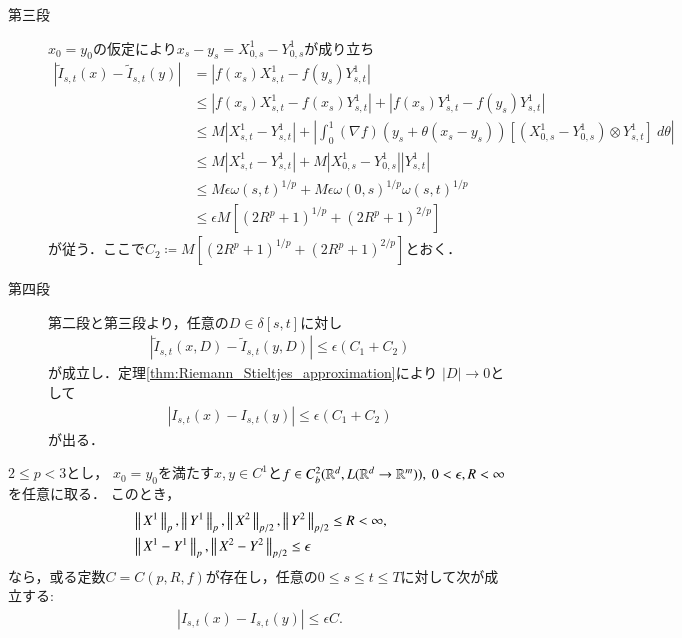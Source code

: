 \begin{prf}
\begin{description}
			\item[第三段]
				$x_0 = y_0$の仮定により$x_s-y_s = X^1_{0,s} - Y^1_{0,s}$が成り立ち
				\begin{align}
					\left| \tilde{I}_{s,t}(x) - \tilde{I}_{s,t}(y) \right|
					&= \left| f(x_s)X^1_{s,t} - f(y_s)Y^1_{s,t} \right| \\
					&\leq \left| f(x_s)X^1_{s,t} - f(x_s)Y^1_{s,t} \right|
						+ \left| f(x_s)Y^1_{s,t} - f(y_s)Y^1_{s,t} \right| \\
					&\leq M \left| X^1_{s,t} - Y^1_{s,t} \right|
						+ \left| \int_0^1 (\nabla f)(y_s + \theta(x_s - y_s)) \left[ \left( X^1_{0,s} - Y^1_{0,s}\right) \otimes Y^1_{s,t} \right]\ d\theta \right| \\
					&\leq M \left| X^1_{s,t} - Y^1_{s,t} \right|
						+ M \left| X^1_{0,s} - Y^1_{0,s}\right| \left| Y^1_{s,t} \right| \\
					&\leq M \epsilon \omega(s,t)^{1/p} + M \epsilon \omega(0,s)^{1/p} \omega(s,t)^{1/p} \\
					&\leq \epsilon M\left[\left( 2 R^p + 1 \right)^{1/p} + \left( 2 R^p + 1 \right)^{2/p} \right]
				\end{align}
				が従う．ここで$C_2 \coloneqq M\left[\left( 2 R^p + 1 \right)^{1/p} + \left( 2 R^p + 1 \right)^{2/p} \right]$とおく．
				
			\item[第四段]
				第二段と第三段より，任意の$D \in \delta[s,t]$に対し
				\begin{align}
					\left| \tilde{I}_{s,t}(x,D) - \tilde{I}_{s,t}(y,D) \right|
					\leq \epsilon (C_1 + C_2)
				\end{align}
				が成立し．定理\ref{thm:Riemann_Stieltjes_approximation}により
				$|D| \longrightarrow 0$として
				\begin{align}
					\left| I_{s,t}(x) - I_{s,t}(y) \right|
					\leq \epsilon (C_1 + C_2)
				\end{align}
				が出る．
				\QED
		\end{description}
	\end{prf}
	
	\begin{screen}
		\begin{thm}\label{thm:continuity_theorem_2}
			$2 \leq p < 3$とし，
			$x_0 = y_0$を満たす$x,y \in C^1$と$f \in C^2_b(\mathbb{R}^d,L(\mathbb{R}^d \rightarrow \mathbb{R}^m)),\ 0 < \epsilon, R < \infty$を任意に取る．
			このとき，
			\begin{align}
				&\left\|\, X^1\, \right\|_{p},\left\|\, Y^1\, \right\|_{p},\left\|\, X^2\, \right\|_{p/2},\left\|\, Y^2\, \right\|_{p/2} \leq R < \infty,\\
				&\left\|\, X^1 - Y^1\, \right\|_{p},\left\|\, X^2 - Y^2\, \right\|_{p/2} \leq \epsilon
			\end{align}
			なら，或る定数$C = C(p,R,f)$が存在し，任意の$0 \leq s \leq t \leq T$に対して次が成立する:
			\begin{align}
				\left| I_{s,t}(x) - I_{s,t}(y) \right| \leq \epsilon C.
			\end{align}
		\end{thm}
	\end{screen}
	
